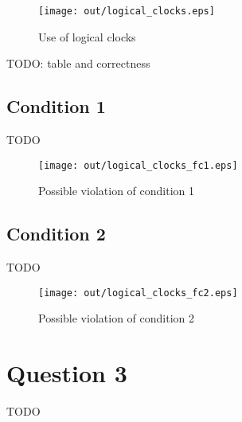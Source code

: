 \documentclass[twocolumn]{article}
\begin{document}
\begin{figure}[h!]
  \centering
  \texttt{[image: out/logical\_clocks.eps]}
  \caption{Use of logical clocks}
  \label{fig:logical_clocks}
\end{figure}

TODO: table and correctness

\subsection{Condition 1}

TODO

\begin{figure}[h!]
  \centering
  \texttt{[image: out/logical\_clocks\_fc1.eps]}
  \caption{Possible violation of condition 1}
  \label{fig:logical_clocks_fc1}
\end{figure}

\subsection{Condition 2}

TODO

\begin{figure}[h!]
  \centering
  \texttt{[image: out/logical\_clocks\_fc2.eps]}
  \caption{Possible violation of condition 2}
  \label{fig:logical_clocks_fc2}
\end{figure}


\section{Question 3}

TODO
\end{document}
